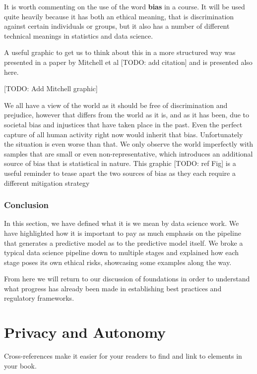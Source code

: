 \documentclass[
]{book}
\theoremstyle{definition}
\theoremstyle{definition}
\theoremstyle{definition}
\theoremstyle{definition}
\theoremstyle{remark}
\begin{document}
It is worth commenting on the use of the word \textbf{bias} in a course. It will be used quite heavily because it has both an ethical meaning, that is discrimination against certain individuals or groups, but it also has a number of different technical meanings in statistics and data science.

A useful graphic to get us to think about this in a more structured way was presented in a paper by Mitchell et al {[}TODO: add citation{]} and is presented also here.

{[}TODO: Add Mitchell graphic{]}

We all have a view of the world as it should be free of discrimination and prejudice, however that differs from the world as it is, and as it has been, due to societal bias and injustices that have taken place in the past. Even the perfect capture of all human activity right now would inherit that bias. Unfortunately the situation is even worse than that. We only observe the world imperfectly with samples that are small or even non-representative, which introduces an additional source of bias that is statistical in nature. This graphic {[}TODO: ref Fig{]} is a useful reminder to tease apart the two sources of bias as they each require a different mitigation strategy

\hypertarget{conclusion-1}{%
\subsection{Conclusion}\label{conclusion-1}}

In this section, we have defined what it is we mean by data science work. We have highlighted how it is important to pay as much emphasis on the pipeline that generates a predictive model as to the predictive model itself. We broke a typical data science pipeline down to multiple stages and explained how each stage poses its own ethical risks, showcasing some examples along the way.

From here we will return to our discussion of foundations in order to understand what progress has already been made in establishing best practices and regulatory frameworks.

\hypertarget{ch-privacy-and-autonomy}{%
\chapter{Privacy and Autonomy}\label{ch-privacy-and-autonomy}}

Cross-references make it easier for your readers to find and link to elements in your book.
\end{document}
